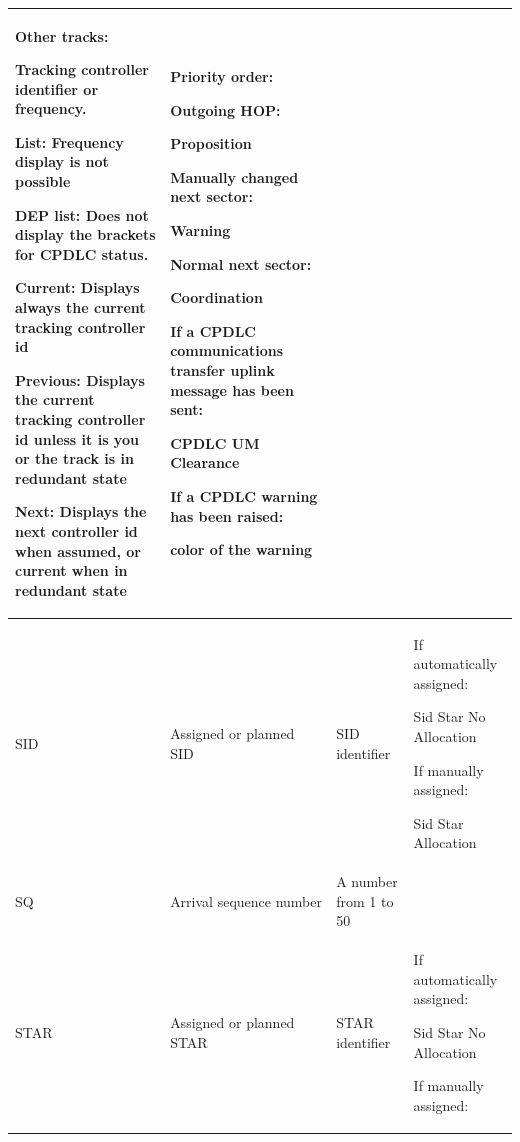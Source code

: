 \documentclass[11pt,a4paper,oldfontcommands]{memoir}
\begin{document}
\begin{longtable}{|p{2.5cm}|p{2.5cm}|p{4.5cm}|p{4.5cm}|}
      Other tracks: 
      
      Tracking controller identifier or  frequency. 
      \bigskip
      
      List: Frequency display is not possible 
      \bigskip
      
      DEP list: Does not display the  brackets for CPDLC status. 
      \bigskip
      
      Current: Displays always the  current tracking controller id 
      \bigskip
      
      Previous: Displays the current tracking controller id unless it is you or the track is in redundant state 
      \bigskip
      
      Next: Displays the next controller id when assumed, or current when in redundant state &
      Priority order: 
      \bigskip
      
      Outgoing HOP: 
      
      Proposition 
      \bigskip
      
      Manually changed next sector: 
      
      Warning 
      \bigskip
      
      Normal next sector:
      
      Coordination 
      \bigskip
      
      If a CPDLC communications transfer uplink message has been sent:  
      
      CPDLC UM Clearance 
      \bigskip
      
      If a CPDLC warning has been raised: 
      
      color of the  warning \\ \hline
    SID &
      Assigned or planned SID &
      SID identifier &
      If automatically assigned:  
      
      Sid Star No Allocation 
      \bigskip
      
      If manually assigned: 
      
      Sid Star Allocation \\ \hline
    SQ &
      Arrival sequence number &
      A number from 1 to 50 &
       \\ \hline
    STAR &
      Assigned or planned STAR &
      STAR identifier &
      If automatically assigned:  
      
      Sid Star No Allocation 
      \bigskip
      
      If manually assigned: 
      

\end{longtable}
\end{document}
